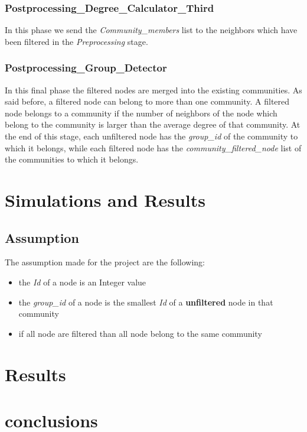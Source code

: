 \documentclass[12pt]{article}
\begin{document}
\subsubsection{Postprocessing\_Degree\_Calculator\_Third}
In this phase we send the \emph{Community\_members} list to the neighbors which have been filtered in the \emph{Preprocessing} stage.
\subsubsection{Postprocessing\_Group\_Detector}
In this final phase the filtered nodes are merged into the existing communities. As said before, a filtered node can belong to more than one community. A filtered node belongs to a community if the number of neighbors of the node which belong to the community is larger than the average degree of that community. At the end of this stage, each unfiltered node has the \emph{group\_id} of the community to which it belongs, while each filtered node has the \emph{community\_filtered\_node} list of the communities to which it belongs.
\section{Simulations and Results}
\subsection{Assumption}
The assumption made for the project are the following:
\begin{itemize}
    \item the \emph{Id} of a node is an Integer value
    \item the \emph{group\_id} of a node is the smallest \emph{Id} of a \textbf{unfiltered }node in that community
    \item if all node are filtered than all node belong to the same community
\end{itemize}


\section{Results}\label{results}
\section{conclusions}
\label{conclu}




\end{document}
